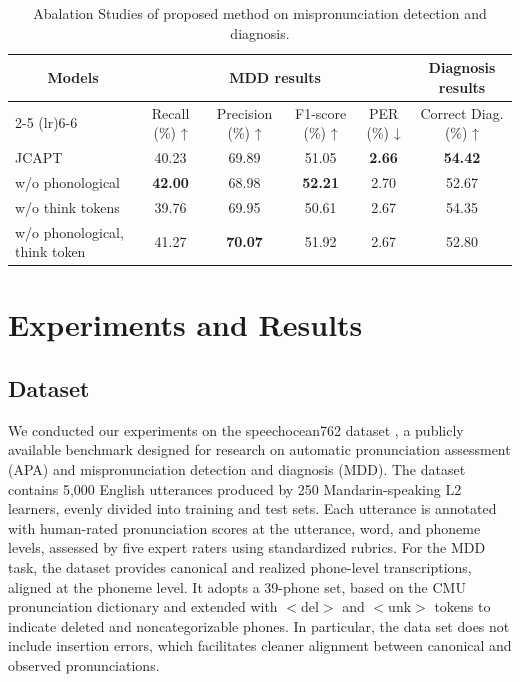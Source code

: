 \documentclass{Interspeech}
\begin{document}
\begin{table}[t]
\centering
\small
\setlength{\tabcolsep}{8pt} %
\renewcommand{\arraystretch}{1.2}
\begin{tabular}{lccccc}
\toprule
\multicolumn{1}{c}{\multirow{2}{*}{\textbf{Models}}} & \multicolumn{4}{c}{\textbf{MDD results}} & \textbf{Diagnosis results} \\
\cmidrule(lr){2-5} \cmidrule(lr){6-6}
\multicolumn{1}{c}{} & Recall (\%) ↑ & Precision (\%) ↑ & F1-score (\%) ↑ & PER (\%) ↓ & Correct Diag. (\%) ↑ \\
\midrule
JCAPT                                 & 40.23 & 69.89 & 51.05 & \textbf{2.66} & \textbf{54.42} \\
w/o phonological                 & \textbf{42.00} & 68.98 & \textbf{52.21} & 2.70 & 52.67 \\
w/o think tokens                    & 39.76 & 69.95 & 50.61 & 2.67 & 54.35 \\
w/o phonological, think token & 41.27 & \textbf{70.07} & 51.92 & 2.67 & 52.80 \\
\bottomrule
\end{tabular}
\caption{Abalation Studies of proposed method on mispronunciation detection and diagnosis.}
\label{ablation_MDD}
\end{table}


\section{Experiments and Results}
\subsection{Dataset}
We conducted our experiments on the speechocean762 dataset \cite{zhang2021speechocean762}, a publicly available benchmark designed for research on automatic pronunciation assessment (APA) and mispronunciation detection and diagnosis (MDD). The dataset contains 5,000 English utterances produced by 250 Mandarin-speaking L2 learners, evenly divided into training and test sets. 
Each utterance is annotated with human-rated pronunciation scores at the utterance, word, and phoneme levels, assessed by five expert raters using standardized rubrics. For the MDD task, the dataset provides canonical and realized phone-level transcriptions, aligned at the phoneme level. It adopts a 39-phone set, based on the CMU pronunciation dictionary \cite{weide2005carnegie} and extended with $<$del$>$ and $<$unk$>$ tokens to indicate deleted and noncategorizable phones. In particular, the data set does not include insertion errors, which facilitates cleaner alignment between canonical and observed pronunciations. 
\end{document}
